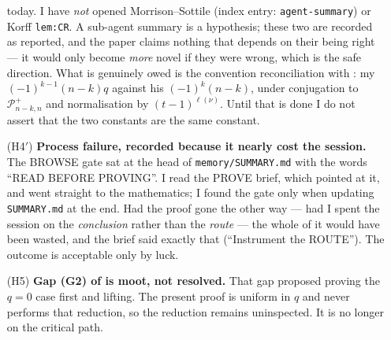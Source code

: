 \documentclass[11pt]{article}
\theoremstyle{plain}
\theoremstyle{definition}
\begin{document}
\begin{enumerate}
today.  I have \emph{not} opened Morrison--Sottile \cite{MS} (index entry:
\texttt{agent-summary}) or Korff \cite{Korff18} \texttt{lem:CR}.  A sub-agent
summary is a hypothesis; these two are recorded as reported, and the paper
claims nothing that depends on their being right --- it would only become
\emph{more} novel if they were wrong, which is the safe direction.  What is
genuinely owed is the convention reconciliation with \cite{Korff19}: my
$(-1)^{k-1}(n-k)q$ against his $(-1)^k(n-k)$, under conjugation to
$\mathcal P^+_{n-k,n}$ and normalisation by $(t-1)^{\ell(\nu)}$.  Until that is
done I do not assert that the two constants are the same constant.
\item[(H4$'$)] \textbf{Process failure, recorded because it nearly cost the
session.}  The BROWSE gate sat at the head of \texttt{memory/SUMMARY.md} with
the words ``READ BEFORE PROVING''.  I read the PROVE brief, which pointed at it,
and went straight to the mathematics; I found the gate only when updating
\texttt{SUMMARY.md} at the end.  Had the proof gone the other way --- had I
spent the session on the \emph{conclusion} rather than the \emph{route} --- the
whole of it would have been wasted, and the brief said exactly that
(``Instrument the ROUTE'').  The outcome is acceptable only by luck.
\item[(H5)] \textbf{Gap (G2) of \cite{Clio201} is moot, not resolved.}  That
gap proposed proving the $q=0$ case first and lifting.  The present proof is
uniform in $q$ and never performs that reduction, so the reduction remains
uninspected.  It is no longer on the critical path.
\end{enumerate}
\end{document}
